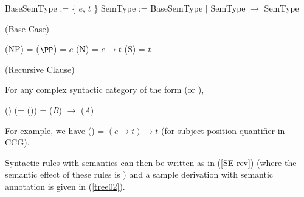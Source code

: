 \documentclass[output=paper]{langsci/langscibook}
\begin{document}
\begin{exe}
 \ex\label{semtyp-def}
  \begin{xlist}
 \ex\label{}
    BaseSemType := \{ $e$, $t$ \}
 \ex\label{}
    SemType := BaseSemType $|$ SemType \ensuremath{ \rightarrow } SemType
  \end{xlist}
 \ex\label{semtyp-base}
  (Base Case)
  \begin{xlist}
 \ex\label{semtyp-np}
    \SemTyp(NP) = \SemTyp($\PP$) = $e$
 \ex\label{semtyp-np}
    \SemTyp(N) = $e \ensuremath{ \rightarrow } t$
 \ex\label{semtyp-s}
    \SemTyp(S) = $t$
  \end{xlist}
 \ex\label{semtyp-recur}
  (Recursive Clause)
  
  For any complex syntactic category of the form
      (or ), 
  
     \SemTyp()
     (= \SemTyp()) =
     \SemTyp(\textit{B}) \ensuremath{ \rightarrow } \SemTyp(\textit{A})
\end{exe}
For example, we have \SemTyp() =  $(e \ensuremath{ \rightarrow } t) \ensuremath{ \rightarrow } t$
(for subject position quantifier in CCG).

Syntactic rules with semantics can then be written as in (\ref{SE-rev})
(where the semantic effect of these rules is )
and a sample derivation with semantic annotation is given in (\ref{tree02}).
\end{document}
